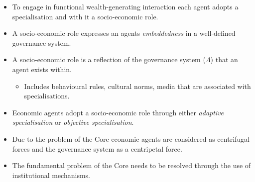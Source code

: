 \documentclass[10pt]{beamer}
\begin{document}
\begin{frame}
\begin{itemize}
\item To engage in functional wealth-generating interaction each agent adopts a specialisation and with it a socio-economic role.
\medskip
\item A socio-economic role expresses an agents \emph{embeddedness} in a well-defined governance system.
\medskip
\begin{figure}[h]
\begin{center}
\end{center}
\end{figure}
\medskip
\item A socio-economic role is a reflection of the governance system ($\Lambda$) that an agent exists within. 
\begin{itemize}
\medskip
\item Includes behavioural rules, cultural norms, media that are associated with specialisations.
\end{itemize}
\medskip
\item Economic agents adopt a socio-economic role through either \emph{adaptive specialisation} or \emph{objective specialisation}.
\end{itemize}
\end{frame}


\begin{frame} %
\begin{figure}[h]
\begin{center}
\end{center}
\end{figure}
\begin{itemize}
\item Due to the problem of the Core economic agents are considered as centrifugal forces and the governance system as a centripetal force.
\medskip
\item The fundamental problem of the Core needs to be resolved through the use of institutional mechanisms.
\end{itemize}
\end{frame}
\end{document}
